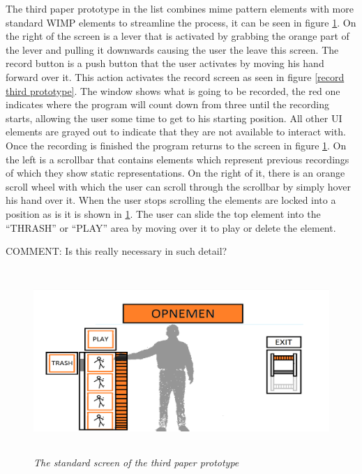 The third paper prototype in the list combines mime pattern elements with more standard WIMP elements to streamline the process, it can be seen in figure \ref{standard third prototype}. On the right of the screen is a lever that is activated by grabbing the orange part of the lever and pulling it downwards causing the user the leave this screen. The record button is a push button that the user activates by moving his hand forward over it. This action activates the record screen as seen in figure \ref{record third prototype}. The window shows what is going to be recorded, the red one indicates where the program will count down from three until the recording starts, allowing the user some time to get to his starting position. All other UI elements are grayed out to indicate that they are not available to interact with. Once the recording is finished the program returns to the screen in figure \ref{standard third prototype}. On the left is a scrollbar that contains elements which represent previous recordings of which they show static representations. On the right of it, there is an orange scroll wheel with which the user can scroll through the scrollbar by simply hover his hand over it. When the user stops scrolling the elements are locked into a position as is it is shown in \ref{standard third prototype}. The user can slide the top element into the ``THRASH'' or ``PLAY'' area by moving over it to play or delete the element. 

{\large COMMENT: Is this really necessary in such detail?}

\begin{figure}[H]
	\begin{center}
		\includegraphics[width=12.5cm, height=7cm]{figures/prototype_5_3_standard.png}
		\caption{\emph{The standard screen of the third paper prototype}}
		\label{standard third prototype}
	\end{center}
\end{figure}

